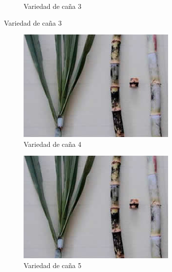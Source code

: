 \documentclass{article}%
\begin{document}
\begin{figure}[h!]
\begin{subfigure}{0.33\linewidth}
\caption{Variedad de caña 3}%
\end{subfigure}%
\linebreak%
\newpage%
\end{figure}

%


\begin{figure}[h!]%
\begin{subfigure}{0.33\linewidth}%
\includegraphics[width=0.95\linewidth]{Cana/RD75-11.png}%
\caption{Variedad de caña 4}%
\end{subfigure}%
\begin{subfigure}{0.33\linewidth}%
\includegraphics[width=0.95\linewidth]{Cana/RD75-11.png}%
\caption{Variedad de caña 5}%
\end{subfigure}%
\begin{subfigure}{0.33\linewidth}%

\end{subfigure}
\end{figure}
\end{document}
